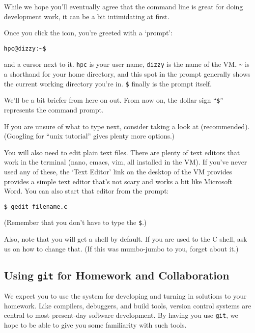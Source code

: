 \documentclass[11pt]{article}
\begin{document}
While we hope you'll eventually agree that the command line is great
for doing development work, it can be a bit intimidating at first.

Once you click the icon, you're greeted with a `prompt':
\begin{lstlisting}
hpc@dizzy:~$
\end{lstlisting}
and a cursor next to it. \texttt{hpc} is your user name,
\texttt{dizzy} is the name of the VM. \texttt{\~} is a shorthand for
your home directory, and this spot in the prompt generally shows the
current working directory you're in. \verb|$| finally is the prompt
itself.

\begin{note}
We'll be a bit briefer from here on out.  From now on, the dollar
sign ``\texttt{\$}'' represents the command prompt.
\end{note}

If you are unsure of what to type next, consider taking a look at
 (recommended). (Googling for ``unix tutorial''
gives plenty more options.)

You will also need to edit plain text files. There are plenty of text
editors that work in the terminal (nano, emacs, vim, all installed in
the VM). If you've never used any of these, the `Text Editor' link on
the desktop of the VM provides  provides a simple text editor that's
not scary and works a bit like Microsoft Word.  You can also start
that editor from the prompt:
\begin{lstlisting}
$ gedit filename.c
\end{lstlisting}
(Remember that you don't have to type the \verb|$|.)

Also, note that you will get a
 shell
by default. If you are used to the C shell, ask us on how to change
that. (If this was mumbo-jumbo to you, forget about it.)

\subsection*{Using \texttt{git} for Homework and Collaboration}

We expect you to use the
 system  for
developing and turning in solutions to your homework. Like compilers,
debuggers, and build tools, version control systems are central to
most present-day software development. By having you use \texttt{git},
we hope to be able to give you some familiarity with such tools.
\end{document}

